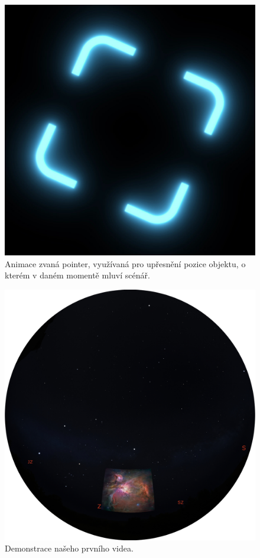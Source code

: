 \documentclass[12pt,a4paper,titlepage]{article}
\begin{document}
\begin{figure}[ht]
\centering
\includegraphics[width=.5\textwidth]{pointer.eps}
\caption{Animace zvaná pointer, využívaná pro upřesnění pozice objektu, o kterém v daném momentě mluví scénář.}
\label{img:pointer}
\end{figure}
\begin{figure}[ht]
\centering
\includegraphics[width=.7\textwidth]{prosinec.eps}
\caption{Demonstrace našeho prvního videa.}
\label{img:prosinec}
\end{figure}
\end{document}

